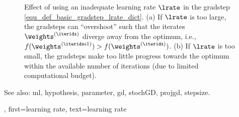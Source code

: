 {{\begin{figure}[H]
\begin{center}
\begin{minipage}{0.45\columnwidth}
			\end{minipage}
			\end{center}
		\caption{Effect of using an inadequate learning rate $\lrate$ in the \gls{gradstep} 
			\eqref{equ_def_basic_gradstep_lrate_dict}. (a) If $\lrate$ is too large, 
			the \glspl{gradstep} can ``overshoot'' such that the iterates $\weights^{(\iteridx)}$ 
			diverge away from the optimum, i.e., $f(\weights^{(\iteridx\!+\!1)}) > f(\weights^{(\iteridx)})$. 
			(b) If $\lrate$ is too small, the \glspl{gradstep} make too little progress towards 
			the optimum within the available number of \glspl{iteration} (due to limited computational budget). 
			\label{fig_small_large_lrate_dict}}
		\end{figure}
		See also: \gls{ml}, \gls{hypothesis}, \gls{parameter}, \gls{gd}, \gls{stochGD}, \gls{projgd}, \gls{stepsize}.},
	first={learning rate},
	text={learning rate} 
}

